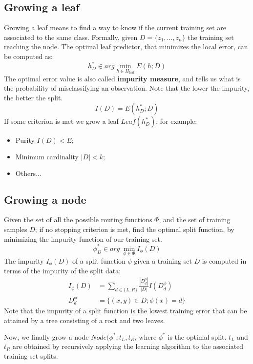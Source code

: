 \subsection{Growing a leaf}
Growing a leaf means to find a way to know if the current training set are associated to the same class. Formally, given \(D = \{z_1,...,z_n\}\) the training set reaching the node. The optimal leaf predictor, that minimizes the local error, can be computed as:
\begin{equation}
    h_D^* \in arg \min_{h \in H_\text{leaf}} E(h;D)
\end{equation}
The optimal error value is also called \textbf{impurity measure}, and tells us what is the probability of misclassifying an observation. Note that the lower the impurity, the better the split.
\begin{equation}
    I(D) = E(h_D^*; D)
\end{equation}
If some criterion is met we grow a leaf \(Leaf(h_D^*)\), for example:
\begin{itemize}
    \item 
    Purity \(I(D) < E\);
    \item
    Minimum cardinality \(|D| < k\);
    \item
    Others...
\end{itemize}

\subsection{Growing a node}
Given the set of all the possible routing functions \(\Phi\), and the set of training samples \(D\); if no stopping criterion is met, find the optimal split function, by minimizing the impurity function of our training set.
\begin{equation}
    \phi_D^* \in arg\ \min_{\phi \in \Phi} I_\phi (D)
\end{equation}
The impurity \(I_\phi(D)\) of a split function \(\phi\) given a training set \(D\) is computed in terms of the impurity of the split data:
\begin{align}
    I_\phi(D) &= \sum_{d \in \{L,R\}} \frac {|D_d^\phi|} {|D|} I(D_d^\phi)\\
    D_d^\phi &= \{(x,y) \in D; \phi(x) = d\}
\end{align}
Note that the impurity of a split function is the lowest training error that can be attained by a tree consisting of a root and two leaves.

Now, we finally grow a node \(Node(\phi^*, t_L, t_R\), where \(\phi^*\) is the optimal split. \(t_L\) and \(t_R\) are obtained by recursively applying the learning algorithm to the associated training set splits.

